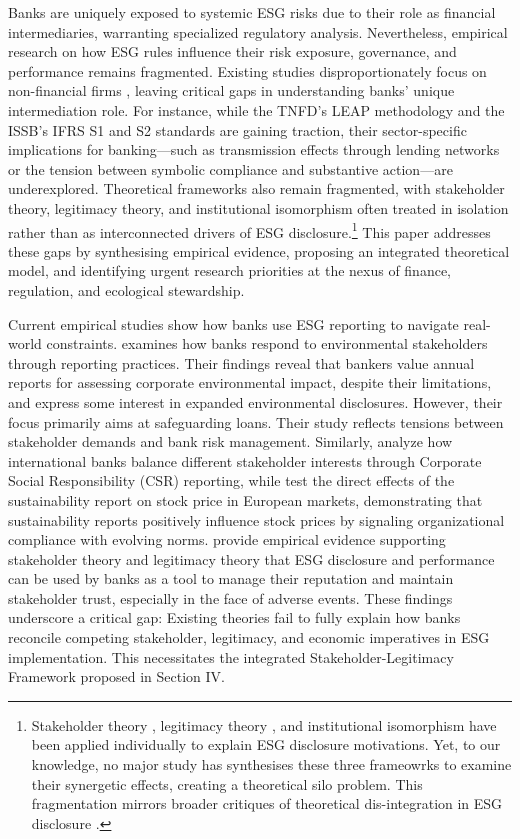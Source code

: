 \documentclass[
  authoryear]{elsarticle}
\begin{document}
Banks are uniquely exposed to systemic ESG risks due to their role as
financial intermediaries, warranting specialized regulatory analysis.
Nevertheless, empirical research on how ESG rules influence their risk
exposure, governance, and performance remains fragmented. Existing
studies disproportionately focus on non-financial firms
\citep[e.g.][]{YOUN2015, FAVINO2019, BUALLAY2019, DYCK2019}, leaving
critical gaps in understanding banks' unique intermediation role. For
instance, while the TNFD's LEAP methodology and the ISSB's IFRS S1 and
S2 standards are gaining traction, their sector-specific implications
for banking---such as transmission effects through lending networks or
the tension between symbolic compliance and substantive action---are
underexplored. Theoretical frameworks also remain fragmented, with
stakeholder theory, legitimacy theory, and institutional isomorphism
often treated in isolation rather than as interconnected drivers of ESG
disclosure.\footnote{Stakeholder theory
  \citep{FREEMAN1984, MITCHELL1997}, legitimacy theory
  \citep{SUCHMAN1995}, and institutional isomorphism
  \citep{DIMAGGIO1983} have been applied individually to explain ESG
  disclosure motivations. Yet, to our knowledge, \hspace{0pt}no major
  study\hspace{0pt} has synthesises these three frameowrks to examine
  their synergetic effects, creating a theoretical silo problem. This
  fragmentation mirrors broader critiques of theoretical dis-integration
  in ESG disclosure \citep{ECCLES2012}.} This paper addresses these gaps
by synthesising empirical evidence, proposing an integrated theoretical
model, and identifying urgent research priorities at the nexus of
finance, regulation, and ecological stewardship.

Current empirical studies show how banks use ESG reporting to navigate
real-world constraints. \citet{THOMPSON2004} examines how banks respond
to environmental stakeholders through reporting practices. Their
findings reveal that bankers value annual reports for assessing
corporate environmental impact, despite their limitations, and express
some interest in expanded environmental disclosures. However, their
focus primarily aims at safeguarding loans. Their study reflects
tensions between stakeholder demands and bank risk management.
Similarly, \citet{SCHOLTENS2009} analyze how international banks balance
different stakeholder interests through Corporate Social Responsibility
(CSR) reporting, while \citet{CARNEVALE2014} test the direct effects of
the sustainability report on stock price in European markets,
demonstrating that sustainability reports positively influence stock
prices by signaling organizational compliance with evolving norms.
\citet{MURE2021} provide empirical evidence supporting stakeholder
theory and legitimacy theory that ESG disclosure and performance can be
used by banks as a tool to manage their reputation and maintain
stakeholder trust, especially in the face of adverse events. These
findings underscore a critical gap: Existing theories fail to fully
explain how banks reconcile competing stakeholder, legitimacy, and
economic imperatives in ESG implementation. This necessitates the
integrated Stakeholder-Legitimacy Framework proposed in Section IV.
\end{document}
